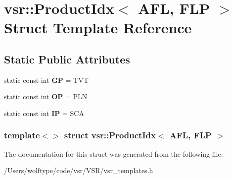 \hypertarget{structvsr_1_1_product_idx_3_01_a_f_l_00_01_f_l_p_01_4}{\section{vsr\-:\-:Product\-Idx$<$ A\-F\-L, F\-L\-P $>$ Struct Template Reference}
\label{structvsr_1_1_product_idx_3_01_a_f_l_00_01_f_l_p_01_4}
}
\subsection*{Static Public Attributes}
\begin{DoxyCompactItemize}
\item 
\hypertarget{structvsr_1_1_product_idx_3_01_a_f_l_00_01_f_l_p_01_4_aa703543752cc9ed5652dd5668cacf26c}{static const int {\bfseries G\-P} = T\-V\-T}\label{structvsr_1_1_product_idx_3_01_a_f_l_00_01_f_l_p_01_4_aa703543752cc9ed5652dd5668cacf26c}

\item 
\hypertarget{structvsr_1_1_product_idx_3_01_a_f_l_00_01_f_l_p_01_4_aef947b6a24701c21adc0010821bef652}{static const int {\bfseries O\-P} = P\-L\-N}\label{structvsr_1_1_product_idx_3_01_a_f_l_00_01_f_l_p_01_4_aef947b6a24701c21adc0010821bef652}

\item 
\hypertarget{structvsr_1_1_product_idx_3_01_a_f_l_00_01_f_l_p_01_4_ac643d5b4782b84247fc3a842c8180386}{static const int {\bfseries I\-P} = S\-C\-A}\label{structvsr_1_1_product_idx_3_01_a_f_l_00_01_f_l_p_01_4_ac643d5b4782b84247fc3a842c8180386}

\end{DoxyCompactItemize}
\subsubsection*{template$<$$>$ struct vsr\-::\-Product\-Idx$<$ A\-F\-L, F\-L\-P $>$}



The documentation for this struct was generated from the following file\-:\begin{DoxyCompactItemize}
\item 
/\-Users/wolftype/code/vsr/\-V\-S\-R/vsr\-\_\-templates.\-h\end{DoxyCompactItemize}
